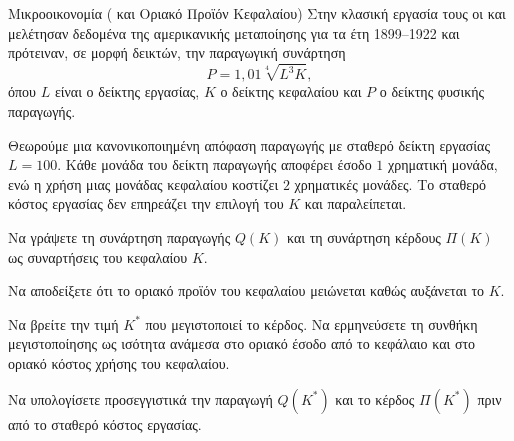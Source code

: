 \begin{problhma}{Μικροοικονομία ( και Οριακό Προϊόν Κεφαλαίου)}
Στην κλασική εργασία τους οι  και  μελέτησαν
δεδομένα της αμερικανικής μεταποίησης για τα έτη 1899--1922 και
πρότειναν, σε μορφή δεικτών, την παραγωγική συνάρτηση
\cite{cobbDouglas1928}
\[
  P=1{,}01\sqrt[4]{L^3K},
\]
όπου $L$ είναι ο δείκτης εργασίας, $K$ ο δείκτης κεφαλαίου και $P$ ο
δείκτης φυσικής παραγωγής.

Θεωρούμε μια κανονικοποιημένη απόφαση παραγωγής με σταθερό δείκτη
εργασίας $L=100$. Κάθε μονάδα του δείκτη παραγωγής αποφέρει έσοδο
$1$ χρηματική μονάδα, ενώ η χρήση μιας μονάδας κεφαλαίου κοστίζει
$2$ χρηματικές μονάδες. Το σταθερό κόστος εργασίας δεν επηρεάζει την
επιλογή του $K$ και παραλείπεται.

\begin{alist}
\item Να γράψετε τη συνάρτηση παραγωγής $Q(K)$ και τη συνάρτηση κέρδους
      $\Pi(K)$ ως συναρτήσεις του κεφαλαίου $K$.
\item Να αποδείξετε ότι το οριακό προϊόν του κεφαλαίου μειώνεται καθώς
      αυξάνεται το $K$.
\item Να βρείτε την τιμή $K^*$ που μεγιστοποιεί το κέρδος. Να
      ερμηνεύσετε τη συνθήκη μεγιστοποίησης ως ισότητα ανάμεσα στο
      οριακό έσοδο από το κεφάλαιο και στο οριακό κόστος χρήσης του
      κεφαλαίου.
\item Να υπολογίσετε προσεγγιστικά την παραγωγή $Q(K^*)$ και το κέρδος
      $\Pi(K^*)$ πριν από το σταθερό κόστος εργασίας.
\end{alist}

\begin{center}
\end{center}
\end{problhma}
